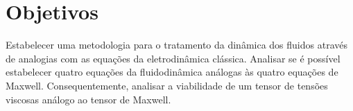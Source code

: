 \chapter[Objetivos]{Objetivos}

Estabelecer uma metodologia para o tratamento da dinâmica dos fluidos através de analogias com as equações da eletrodinâmica clássica. Analisar se é possível estabelecer quatro equações da fluidodinâmica análogas às quatro equações de Maxwell. Consequentemente, analisar a viabilidade de um tensor de tensões viscosas análogo ao tensor de Maxwell.